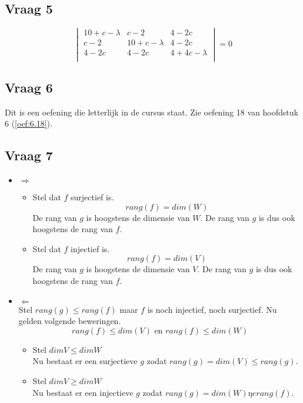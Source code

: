 \documentclass[lineaire_algebra_oplossingen.tex]{subfiles}
\begin{document}

\subsection{Vraag 5}
\[
\begin{vmatrix}
10+c-\lambda & c-2 & 4-2c\\
c-2 & 10+c-\lambda & 4-2c\\
4-2c & 4-2c & 4+4c-\lambda\\
\end{vmatrix}
=
0
\]

\subsection{Vraag 6}
Dit is een oefening die letterlijk in de cursus staat. Zie oefening 18 van hoofdstuk 6 (\ref{oef:6.18}).


\subsection{Vraag 7}
\begin{itemize}
\item $\Rightarrow$\\
\begin{itemize}
\item Stel dat $f$ surjectief is.\\
\[
rang(f) = dim(W)
\]
De rang van $g$ is hoogstens de dimensie van $W$. De rang van $g$ is dus ook hoogstens de rang van $f$. 
\item Stel dat $f$ injectief is.\\
\[
rang(f) = dim(V)
\]
De rang van $g$ is hoogstens de dimensie van $V$. De rang van $g$ is dus ook hoogstens de rang van $f$. 
\end{itemize}
\item $\Leftarrow$\\
Stel $rang(g) \le rang(f)$ maar $f$ is noch injectief, noch surjectief.
Nu gelden volgende beweringen.
\[
rang(f) \le dim(V) \text{ en } rang(f) \le dim(W)
\]
\begin{itemize}
\item Stel $dim V \le dim W$\\
Nu bestaat er een surjectieve $g$ zodat $rang(g) = dim(V) \le rang (g)$.
\item Stel $dim V \ge dim W$\\
Nu bestaat er een injectieve $g$ zodat $rang(g) = dim(W) ŋe rang(f)$.
\end{itemize}
\end{itemize}
\end{document}
